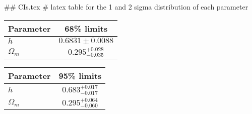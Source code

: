 ## CIs.tex
# latex table for the 1 and 2 sigma distribution of each parameter

\begin{tabular} { l  c}
 Parameter &  68\% limits\\
\hline
{\boldmath$h              $} & $0.6831\pm 0.0088          $\\
{\boldmath$\Omega_m       $} & $0.295^{+0.028}_{-0.035}   $\\
\hline
\end{tabular}

\begin{tabular} { l  c}
 Parameter &  95\% limits\\
\hline
{\boldmath$h              $} & $0.683^{+0.017}_{-0.017}   $\\
{\boldmath$\Omega_m       $} & $0.295^{+0.064}_{-0.060}   $\\
\hline
\end{tabular}

